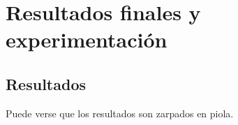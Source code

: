 \section{Resultados finales y experimentación}
\subsection{Resultados}

Puede verse que los resultados son zarpados en piola.